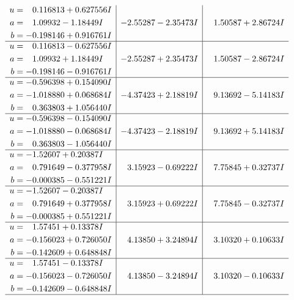 \documentclass[1p]{elsarticle_modified}
\theoremstyle{definition}
\begin{document}
$$\begin{array}{c|c|c}
\begin{aligned}
u &= \phantom{-}0.116813 + 0.627556 I \\
a &= \phantom{-}1.09932 - 1.18449 I \\
b &= -0.198146 + 0.916761 I\end{aligned}
 & -2.55287 - 2.35473 I & \phantom{-}1.50587 + 2.86724 I \\ \hline\begin{aligned}
u &= \phantom{-}0.116813 - 0.627556 I \\
a &= \phantom{-}1.09932 + 1.18449 I \\
b &= -0.198146 - 0.916761 I\end{aligned}
 & -2.55287 + 2.35473 I & \phantom{-}1.50587 - 2.86724 I \\ \hline\begin{aligned}
u &= -0.596398 + 0.154090 I \\
a &= -1.018880 + 0.068684 I \\
b &= \phantom{-}0.363803 + 1.056440 I\end{aligned}
 & -4.37423 + 2.18819 I & \phantom{-}9.13692 - 5.14183 I \\ \hline\begin{aligned}
u &= -0.596398 - 0.154090 I \\
a &= -1.018880 - 0.068684 I \\
b &= \phantom{-}0.363803 - 1.056440 I\end{aligned}
 & -4.37423 - 2.18819 I & \phantom{-}9.13692 + 5.14183 I \\ \hline\begin{aligned}
u &= -1.52607 + 0.20387 I \\
a &= \phantom{-}0.791649 - 0.377958 I \\
b &= -0.000385 - 0.551221 I\end{aligned}
 & \phantom{-}3.15923 - 0.69222 I & \phantom{-}7.75845 + 0.32737 I \\ \hline\begin{aligned}
u &= -1.52607 - 0.20387 I \\
a &= \phantom{-}0.791649 + 0.377958 I \\
b &= -0.000385 + 0.551221 I\end{aligned}
 & \phantom{-}3.15923 + 0.69222 I & \phantom{-}7.75845 - 0.32737 I \\ \hline\begin{aligned}
u &= \phantom{-}1.57451 + 0.13378 I \\
a &= -0.156023 + 0.726050 I \\
b &= -0.142609 + 0.648848 I\end{aligned}
 & \phantom{-}4.13850 + 3.24894 I & \phantom{-}3.10320 + 0.10633 I \\ \hline\begin{aligned}
u &= \phantom{-}1.57451 - 0.13378 I \\
a &= -0.156023 - 0.726050 I \\
b &= -0.142609 - 0.648848 I\end{aligned}
 & \phantom{-}4.13850 - 3.24894 I & \phantom{-}3.10320 - 0.10633 I\\
 \hline 
 \end{array}$$\newpage
\end{document}
